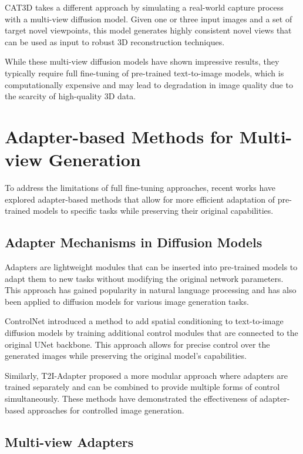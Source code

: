 CAT3D \cite{cat3d} takes a different approach by simulating a real-world capture process with a multi-view diffusion model. Given one or three input images and a set of target novel viewpoints, this model generates highly consistent novel views that can be used as input to robust 3D reconstruction techniques.

While these multi-view diffusion models have shown impressive results, they typically require full fine-tuning of pre-trained text-to-image models, which is computationally expensive and may lead to degradation in image quality due to the scarcity of high-quality 3D data.

\section{Adapter-based Methods for Multi-view Generation}\label{sec:adapters}

To address the limitations of full fine-tuning approaches, recent works have explored adapter-based methods that allow for more efficient adaptation of pre-trained models to specific tasks while preserving their original capabilities.

\subsection{Adapter Mechanisms in Diffusion Models}

Adapters are lightweight modules that can be inserted into pre-trained models to adapt them to new tasks without modifying the original network parameters. This approach has gained popularity in natural language processing and has also been applied to diffusion models for various image generation tasks.

ControlNet \cite{controlnet} introduced a method to add spatial conditioning to text-to-image diffusion models by training additional control modules that are connected to the original UNet backbone. This approach allows for precise control over the generated images while preserving the original model's capabilities.

Similarly, T2I-Adapter \cite{t2iadapter} proposed a more modular approach where adapters are trained separately and can be combined to provide multiple forms of control simultaneously. These methods have demonstrated the effectiveness of adapter-based approaches for controlled image generation.

\subsection{Multi-view Adapters}

